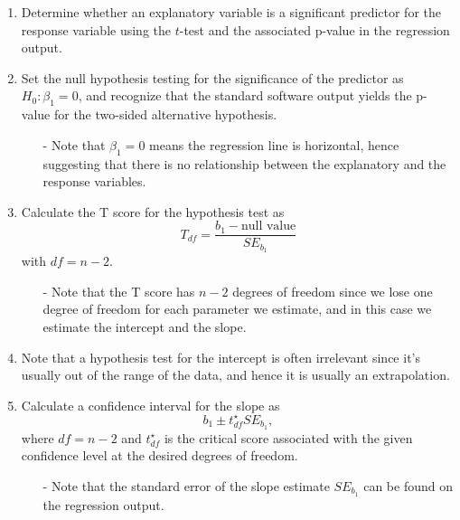 \documentclass[11pt]{article}
\begin{document}
%

\vspace{0.48cm}

%

\begin{enumerate}[resume]
\renewcommand\labelenumi{\textcolor{light}{\textbf{LO \theenumi.}}}

\item Determine whether an explanatory variable is a significant predictor for the response variable using the $t$-test and the associated p-value in the regression output.

\item Set the null hypothesis testing for the significance of the predictor as $H_0: \beta_1 = 0$, and recognize that the standard software output yields the p-value for the two-sided alternative hypothesis.
\begin{itemize}
\item[-] Note that $\beta_1 = 0$ means the regression line is horizontal, hence suggesting that there is no relationship between the explanatory and the response variables.
\end{itemize}

\item Calculate the T score for the hypothesis test as 
\[ T_{df} = \frac{b_1 - \text{null value}}{SE_{b_1}} \]
with $df = n - 2$.
\begin{itemize}
\item[-] Note that the T score has $n - 2$ degrees of freedom since we lose one degree of freedom for each parameter we estimate, and in this case we estimate the intercept and the slope.
\end{itemize}

\item Note that a hypothesis test for the intercept is often irrelevant since it's usually out of the range of the data, and hence it is usually an extrapolation.

\item Calculate a confidence interval for the slope as
\[ b_1 \pm t^\star_{df} SE_{b_1}, \]
where $df = n - 2$ and $t^\star_{df}$ is the critical score associated with the given confidence level at the desired degrees of freedom.
\begin{itemize}
\item[-] Note that the standard error of the slope estimate $SE_{b_1}$ can be found on the regression output.
\end{itemize}

\end{enumerate}
\end{document}
